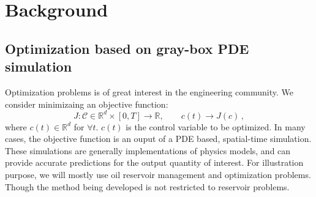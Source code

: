 \documentclass[a4paper,onecolumn]{article}
\theoremstyle{remark}
\begin{document}
\newpage
\tableofcontents

\newpage
\section{Background}
\label{intro}

\subsection{Optimization based on gray-box PDE simulation}
Optimization problems is of great interest in the engineering community. We consider minimizaing an
objective function:
$$
    J: \mathcal{C} \in \mathbb{R}^d\times [0,T] \rightarrow \mathbb{R}, \qquad c(t) \rightarrow J(c)\,,
$$
where $c(t) \in \mathbb{R}^d$ for $\forall t$. $c(t)$ is the control variable to be optimized.
In many cases, the objective function is an ouput of
a PDE based, spatial-time simulation. 
These simulations are generally implementations of physics models, and can provide accurate predictions for
the output quantity of interest.
For illustration purpose, we will mostly use oil reservoir management and optimization problems.
Though the method being developed is not restricted to reservoir problems.\\
\end{document}
